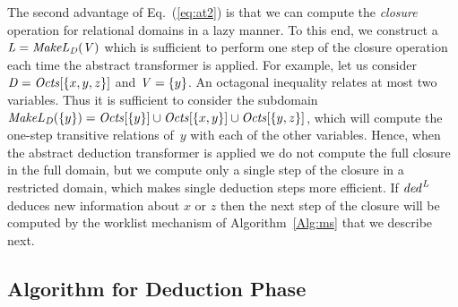 The second advantage of Eq.~(\ref{eq:at2}) is that we can compute the
\emph{closure} operation for relational domains in a lazy manner. To
this end, we construct a $\mathit{L}=\mathit{MakeL}_{\mathit{D}}(\mathit{V})$
which is sufficient to perform one step of the closure operation each
time the abstract transformer is applied.
%
For example, let us consider $\mathit{D}=\mathit{Octs}[\{x,y,z\}]$ and
$\mathit{V}=\{y\}$. An octagonal inequality relates at 
most two variables. Thus it is sufficient to consider the subdomain
$\mathit{MakeL}_{\mathit{D}}(\{y\})=\mathit{Octs}[\{y\}]\cup\mathit{Octs}[\{x,y\}]\cup\mathit{Octs}[\{y,z\}]$,
which will compute the one-step transitive relations of~$y$ with each
of the other variables. 
%
Hence, when the abstract deduction transformer is applied we do not
compute the full closure in the full domain,
but we compute only a single step of the closure in a restricted
domain, which makes single deduction steps more efficient.
%
If $\mathit{ded}^{\mathit{L}}$ deduces new information about $x$ or $z$
then the next step of the closure will be computed by the worklist
mechanism of Algorithm~\ref{Alg:ms} that we describe next.




\subsection{Algorithm for Deduction Phase}
%

